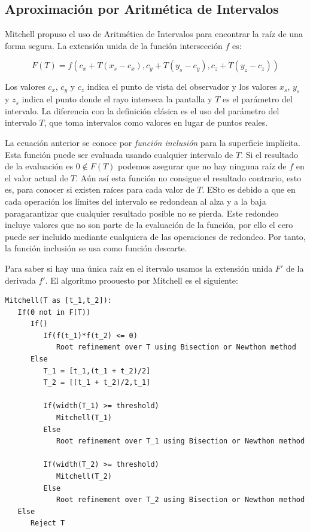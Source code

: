 \subsection{Aproximación por Aritmética de Intervalos}

Mitchell\cite{Mitchell90} propuso el uso de Aritmética de Intervalos para encontrar la raíz de una forma segura. La extensión unida de la función intersección $f$ es:

\begin{equation}
F(T) = f(c_x + T(x_s - c_x), c_y + T(y_s - c_y), c_z + T(y_z - c_z))
\nonumber
\end{equation}

Los valores $c_x$, $c_y$ y $c_z$ indica el punto de vista del observador y los valores $x_s$, $y_s$ y $z_s$ indica el punto donde el rayo interseca la pantalla y $T$ es el parámetro del intervalo. La diferencia con la definición clásica es el uso del parámetro del intervalo $T$, que toma intervalos como valores en lugar de puntos reales.
\par La ecuación anterior se conoce por{ \em función inclusión} para la superficie implícita. Esta función puede ser evaluada usando cualquier intervalo de $T$. Si el resultado de la evaluación es $0 \notin F(T)$ podemos asegurar que no hay ninguna raíz de $f$ en el valor actual de $T$. Aún así esta función no consigue el resultado contrario, esto es, para conocer si existen raíces para cada valor de $T$. ESto es debido a que en cada operación los límites del intervalo se redondean al alza y a la baja paragarantizar que cualquier resultado posible no se pierda. Este redondeo incluye valores que no son parte de la evaluación de la función, por ello el cero puede ser incluido mediante cualquiera de las operaciones de redondeo. Por tanto, la función inclusión se usa como función descarte. 
\par Para saber si hay una única raíz en el itervalo usamos la extensión unida $F'$ de la derivada $f'$. El algoritmo proouesto por Mitchell es el siguiente:

\begin{verbatim}
Mitchell(T as [t_1,t_2]):
   If(0 not in F(T))
      If()
         If(f(t_1)*f(t_2) <= 0)
            Root refinement over T using Bisection or Newthon method
      Else
         T_1 = [t_1,(t_1 + t_2)/2]
         T_2 = [(t_1 + t_2)/2,t_1]
         
         If(width(T_1) >= threshold)
            Mitchell(T_1)
         Else
            Root refinement over T_1 using Bisection or Newthon method
         
         If(width(T_2) >= threshold)
            Mitchell(T_2)
         Else
            Root refinement over T_2 using Bisection or Newthon method
   Else
      Reject T
\end{verbatim}

